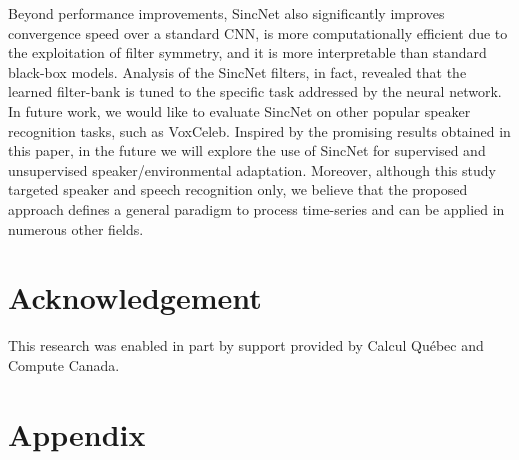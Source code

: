 \documentclass{article}
\begin{document}
Beyond performance improvements, SincNet also significantly improves convergence speed over a standard CNN, is more computationally efficient due to the exploitation of filter symmetry, and it is more interpretable than standard black-box models. Analysis of the SincNet filters, in fact, revealed that the learned filter-bank is tuned to the specific task addressed by the neural network.
In future work, we would like to evaluate SincNet on other popular speaker recognition tasks, such as VoxCeleb. Inspired by the promising results obtained in this paper, in the future we will explore the use of SincNet for supervised and unsupervised speaker/environmental adaptation. 
Moreover, although this study targeted speaker and speech recognition only, we believe that the proposed approach defines a general paradigm to process time-series and can be applied in numerous other fields. 



\section*{Acknowledgement}
This research was enabled in part by support provided by Calcul Qu\'ebec and Compute Canada.




 

\medskip

\small




\newpage

\appendix
\section*{Appendix}
\end{document}
